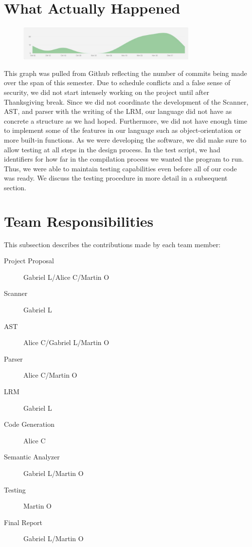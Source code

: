 \documentclass[11pt]{report}
\begin{document}
\section{What Actually Happened}
\begin{figure}[h]
 \centering
 \includegraphics[width=0.8\textwidth]{Github_Graph}
\end{figure}
This graph was pulled from Github reflecting the number of commits being made over the span of this semester. Due to schedule conflicts and a false sense of security, we did not start intensely working on the project until after Thanksgiving break. Since we did not coordinate the development of the Scanner, AST, and parser with the writing of the LRM, our language did not have as concrete a structure as we had hoped. Furthermore, we did not have enough time to implement some of the features in our language such as object-orientation or more built-in functions. As we were developing the software, we did make sure to allow testing at all steps in the design process. In the test script, we had identifiers for how far in the compilation process we wanted the program to run. Thus, we were able to maintain testing capabilities even before all of our code was ready. We discuss the testing procedure in more detail in a subsequent section. 
\section{Team Responsibilities}
This subsection describes the contributions made by each team member:
\begin{description}
\item[Project Proposal] Gabriel L/Alice C/Martin O
\item[Scanner] Gabriel L
\item[AST] Alice C/Gabriel L/Martin O
\item[Parser] Alice C/Martin O
\item[LRM] Gabriel L
\item[Code Generation] Alice C
\item[Semantic Analyzer] Gabriel L/Martin O
\item[Testing] Martin O 
\item[Final Report] Gabriel L/Martin O
\end{description}
\end{document}
